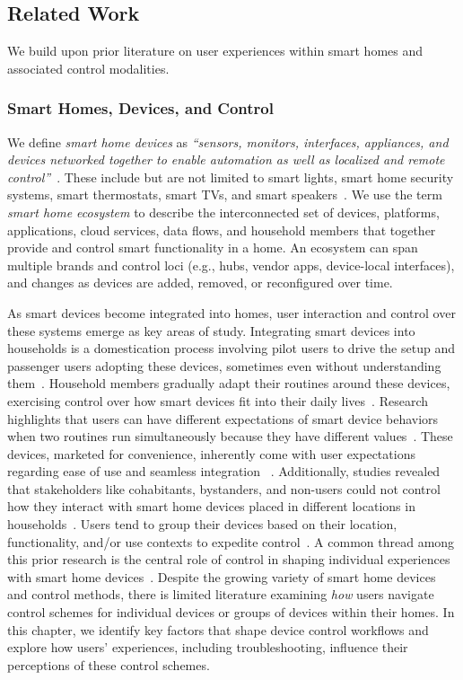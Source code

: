 \subsection{Related Work}
We build upon prior literature on user experiences within smart homes and associated control modalities.

\subsubsection{Smart Homes, Devices, and Control}
\label{cic:sec:relatedWorks-smarthome}
We define \textit{smart home devices} as \textit{``sensors, monitors, interfaces, appliances, and devices networked together to enable automation as well as localized and remote control''}~\cite{hargreaves2017introduction}. These include but are not limited to smart lights, smart home security systems, smart thermostats, smart TVs, and smart speakers~\cite{buil2023digital}. 
We use the term \textit{smart home ecosystem} to describe the interconnected set of devices, platforms, applications, cloud services, data flows, and household members that together provide and control smart functionality in a home. An ecosystem can span multiple brands and control loci (e.g., hubs, vendor apps, device-local interfaces), and changes as devices are added, removed, or reconfigured over time.

As smart devices become integrated into homes, user interaction and control over these systems emerge as key areas of study. Integrating smart devices into households is a domestication process involving pilot users to drive the setup and passenger users adopting these devices, sometimes even without understanding them~\cite{koshy2021we}. Household members gradually adapt their routines around these devices, exercising control over how smart devices fit into their daily lives~\cite{chiang2020exploring}. 
Research highlights that users can have different expectations of smart device behaviors when two routines run simultaneously because they have different values~\cite{zaidi2023user}. These devices, marketed for convenience, inherently come with user expectations regarding ease of use and seamless integration ~\cite{coskun2018smart, mattson_2016}. Additionally, studies revealed that stakeholders like cohabitants, bystanders, and non-users could not control how they interact with smart home devices placed in different locations in households~\cite{meng2023multi}. Users tend to group their devices based on their location, functionality, and/or use contexts to expedite control~\cite{wozniak2023inhabiting}. A common thread among this prior research is the central role of control in shaping individual experiences with smart home devices~\cite{davidoff2006principles}.
Despite the growing variety of smart home devices and control methods, there is limited literature examining \textit{how} users navigate control schemes for individual devices or groups of devices within their homes. In this chapter, we identify key factors that shape device control workflows and explore how users' experiences, including troubleshooting, influence their perceptions of these control schemes.

